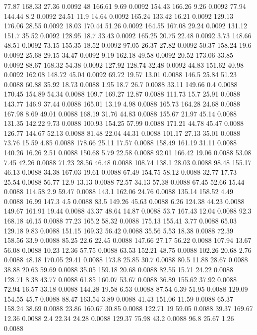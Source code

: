 77.87	168.33	27.36	0.0092
48	166.61	9.69	0.0092
154.43	166.26	9.26	0.0092
77.94	144.44	8.2	0.0092
24.51	11.9	14.64	0.0092
165.24	133.42	16.21	0.0092
129.13	176.06	28.55	0.0092
18.03	170.44	51.26	0.0092
164.55	167.08	29.24	0.0092
131.12	151.7	35.52	0.0092
128.95	18.7	33.43	0.0092
165.25	20.75	22.48	0.0092
3.73	148.66	48.51	0.0092
73.15	155.35	18.52	0.0092
97.05	26.37	27.82	0.0092
50.37	158.24	19.6	0.0092
25.68	29.15	34.47	0.0092
9.19	162.18	49.58	0.0092
20.52	173.06	33.85	0.0092
88.67	168.32	54.38	0.0092
127.92	128.74	32.48	0.0092
44.83	151.62	40.98	0.0092
162.08	148.72	45.04	0.0092
69.72	19.57	13.01	0.0088
146.5	25.84	51.23	0.0088
60.88	35.92	18.73	0.0088
1.95	18.7	26.7	0.0088
33.11	149.66	0.4	0.0088
170.45	154.89	54.34	0.0088
109.7	169.27	12.87	0.0088
111.73	15.7	25.91	0.0088
143.77	146.9	37.44	0.0088
165.01	13.19	4.98	0.0088
165.73	164.28	24.68	0.0088
167.98	8.69	49.01	0.0088
168.19	31.76	44.83	0.0088
155.67	21.97	45.14	0.0088
131.35	142.22	9.73	0.0088
100.93	154.25	57.99	0.0088
171.21	44.78	45.47	0.0088
126.77	144.67	52.13	0.0088
81.48	22.04	44.31	0.0088
101.17	27.13	35.01	0.0088
73.76	15.59	4.85	0.0088
178.66	25.11	17.57	0.0088
158.49	161.19	31.11	0.0088
140.26	16.26	2.51	0.0088
150.68	5.79	22.58	0.0088
92.01	166.42	19.06	0.0088
53.08	7.45	42.26	0.0088
71.23	28.56	46.48	0.0088
108.74	138.1	28.03	0.0088
98.48	155.17	46.13	0.0088
34.38	167.03	19.61	0.0088
67.49	154.75	58.12	0.0088
32.77	17.73	25.54	0.0088
56.77	12.9	13.13	0.0088
72.57	34.13	57.38	0.0088
67.45	52.66	15.44	0.0088
114.58	2.9	59.47	0.0088
143.1	162.06	24.76	0.0088
135.14	158.52	4.49	0.0088
16.99	147.3	4.5	0.0088
83.5	149.26	45.63	0.0088
6.26	124.38	44.23	0.0088
149.67	161.91	19.44	0.0088
43.37	48.64	14.87	0.0088
53.7	167.43	12.04	0.0088
92.3	168.18	46.15	0.0088
77.23	165.2	58.32	0.0088
175.13	155.41	3.77	0.0088
65.03	129.18	9.83	0.0088
151.15	169.32	56.42	0.0088
35.56	5.53	18.38	0.0088
72.39	158.56	33.9	0.0088
85.25	22.6	22.45	0.0088
147.66	27.17	56.22	0.0088
107.94	13.67	56.08	0.0088
10.23	12.36	57.75	0.0088
63.53	152.21	48.75	0.0088
102.26	20.68	2.76	0.0088
48.18	170.05	29.41	0.0088
173.8	25.85	30.7	0.0088
80.5	11.88	28.67	0.0088
38.88	20.63	59.69	0.0088
35.05	159.18	20.68	0.0088
82.55	15.71	24.22	0.0088
128.71	8.38	43.77	0.0088
61.85	160.07	53.67	0.0088
36.89	155.62	37.92	0.0088
72.94	16.57	33.18	0.0088
144.28	19.58	6.53	0.0088
87.54	6.39	51.95	0.0088
129.09	154.55	45.7	0.0088
88.47	163.54	3.89	0.0088
41.43	151.06	11.59	0.0088
65.37	158.24	38.69	0.0088
23.86	160.67	30.85	0.0088
122.71	19	59.05	0.0088
39.37	169.67	12.36	0.0088
2.4	22.34	24.28	0.0088
129.37	75.98	43.2	0.0088
96.8	25.67	1.26	0.0088
